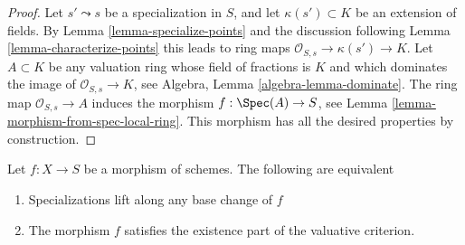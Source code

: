 \begin{proof}
Let $s' \leadsto s$ be a specialization in $S$, and let
$\kappa(s') \subset K$ be an extension of fields. By
Lemma \ref{lemma-specialize-points}
and the discussion following
Lemma \ref{lemma-characterize-points}
this leads to ring maps $\mathcal{O}_{S, s} \to \kappa(s') \to K$.
Let $A \subset K$ be any valuation ring whose field of fractions is
$K$ and which dominates the image of $\mathcal{O}_{S, s} \to K$, see
Algebra, Lemma \ref{algebra-lemma-dominate}.
The ring map $\mathcal{O}_{S, s} \to A$ induces the morphism
$f : \Spec(A) \to S$, see
Lemma \ref{lemma-morphism-from-spec-local-ring}.
This morphism has all the desired properties by construction.
\end{proof}

\begin{lemma}
\label{lemma-lift-specializations-valuative}
Let $f : X \to S$ be a morphism of schemes.
The following are equivalent
\begin{enumerate}
\item Specializations lift along any base change of $f$
\item The morphism $f$ satisfies the existence part of the
valuative criterion.
\end{enumerate}
\end{lemma}

